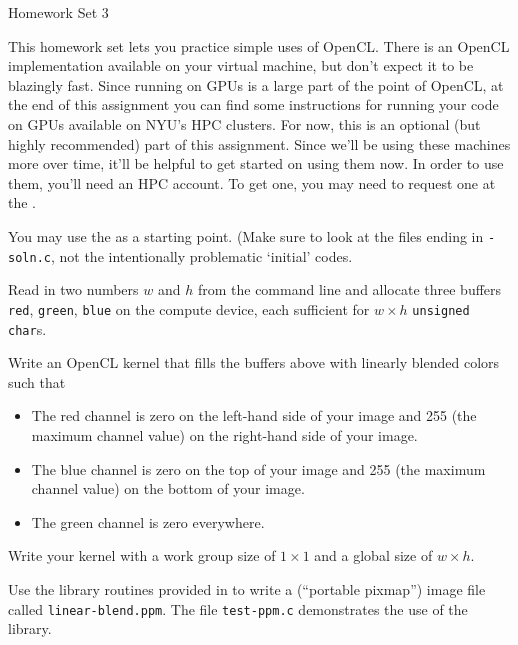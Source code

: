\documentclass[11pt]{article}
\begin{document}
%
{Homework Set 3}

This homework set lets you practice simple uses of OpenCL. There is an
OpenCL implementation available on your virtual machine, but don't
expect it to be blazingly fast.  Since running on GPUs is a large part
of the point of OpenCL, at the end of this assignment you can find
some instructions for running your code on GPUs available on NYU's HPC
clusters. For now, this is an optional (but highly recommended) part
of this assignment. Since we'll be using these machines more over
time, it'll be helpful to get started on using them now. In order to use
them, you'll need an HPC account. To get one, you may need to request
one at the .

You may use the  as a starting point. (Make sure to look at the files ending
in \texttt{-soln.c}, not the intentionally problematic `initial'
codes.

\bigskip
{}

Read in two numbers $w$ and $h$ from the command line and allocate three
buffers \texttt{red}, \texttt{green}, \texttt{blue} on the compute
device, each sufficient for $w\times h$ \texttt{unsigned char}s.


Write an OpenCL kernel that fills the buffers above with
linearly blended colors such that
\begin{itemize}
  \item The red channel is zero on the left-hand side of your
    image and 255 (the maximum channel value) on the right-hand side
    of your image.
  \item The blue channel is zero on the top of your
    image and 255 (the maximum channel value) on the bottom
    of your image.
  \item The green channel is zero everywhere.
\end{itemize}
Write your kernel with a work group size of $1\times 1$ and a
global size of $w\times h$.

Use the library routines provided in
 to
write a 
(``portable pixmap'') image file called \texttt{linear-blend.ppm}.
The file \texttt{test-ppm.c} demonstrates the use of the library.
\end{document}
